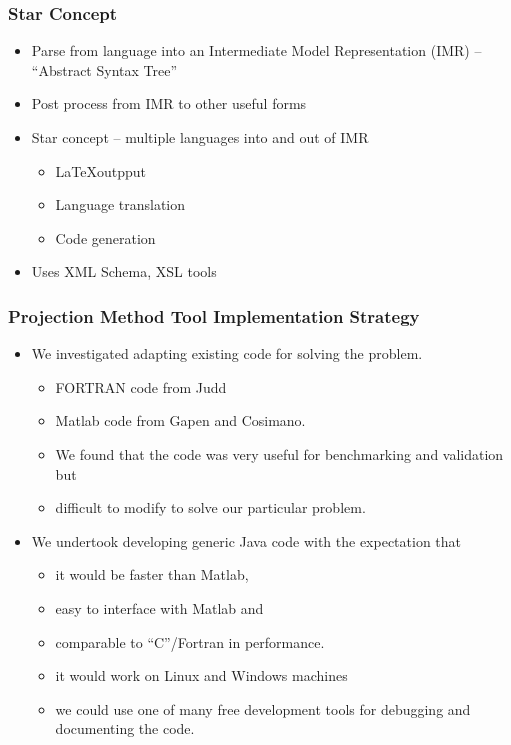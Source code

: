 \documentclass[handout]{beamer}
\begin{document}
\begin{frame}
  \frametitle{Star Concept}
  \begin{itemize}
 \item Parse from language into an Intermediate Model Representation (IMR)
 -- ``Abstract Syntax Tree'' 
  \item Post process from IMR to other useful forms
  \item Star concept --  multiple languages into and out of IMR
    \begin{itemize}
    \item \LaTeX outpput
    \item Language translation
    \item Code generation
    \end{itemize}

  \item Uses XML Schema, XSL tools
  \end{itemize}

\end{frame}

\begin{frame}
  \frametitle{Projection Method Tool Implementation Strategy}

\begin{itemize}
\item We investigated adapting existing code for solving the problem.
  \begin{itemize}
\item FORTRAN code from Judd 
\item  Matlab code from Gapen and Cosimano. 
\item We found that the code was very useful for benchmarking and validation but \item difficult to modify to solve our particular problem.
\end{itemize}
  \end{itemize}

\begin{itemize}
\item We undertook developing generic Java code with the expectation that 
  \begin{itemize}
  \item 
it would be faster than Matlab,
\item easy to interface with Matlab and
\item  comparable to ``C''/Fortran in performance.
\item it would work on Linux and Windows machines
\item we could use one of many free development tools 
for debugging and documenting the code.
  \end{itemize}
\end{itemize}



\end{frame}
\end{document}
